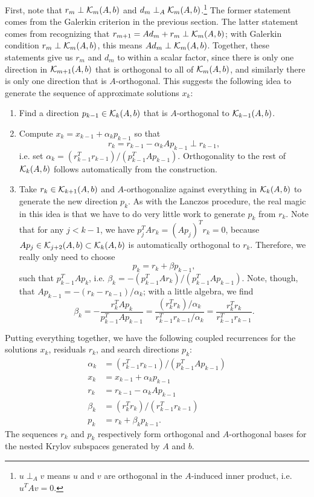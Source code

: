 First, note that $r_m \perp \mathcal{K}_{m}(A,b)$ and $d_m \perp_A
\mathcal{K}_{m}(A,b)$.\footnote{
  $u \perp_A v$ means $u$ and $v$ are orthogonal
  in the $A$-induced inner product, i.e. $u^T A v = 0$.
}  The former statement comes from the Galerkin
criterion in the previous section.  The latter statement comes from
recognizing that $r_{m+1} = Ad_m + r_m \perp \mathcal{K}_{m}(A,b)$; with
Galerkin condition $r_m \perp \mathcal{K}_{m}(A,b)$, this means $Ad_m \perp
\mathcal{K}_{m}(A,b)$.  Together, these statements give us $r_m$ and $d_m$
to within a scalar factor, since there is only one direction in
$\mathcal{K}_{m+1}(A,b)$ that is orthogonal to all of $\mathcal{K}_{m}(A,b)$, and
similarly there is only one direction that is $A$-orthogonal.
This suggests the following idea to generate the sequence of
approximate solutions $x_k$:
\begin{enumerate}
\item
  Find a direction $p_{k-1} \in \mathcal{K}_{k}(A,b)$ that is $A$-orthogonal
  to $\mathcal{K}_{k-1}(A,b)$.
\item
  Compute $x_{k} = x_{k-1} + \alpha_k p_{k-1}$ so that
  \[
    r_k = r_{k-1} - \alpha_k A p_{k-1} \perp r_{k-1},
  \]
  i.e. set $\alpha_k = (r_{k-1}^T r_{k-1}) / (p_{k-1}^T A p_{k-1})$.
  Orthogonality to the rest of $\mathcal{K}_{k}(A,b)$ follows
  automatically from the construction.
\item
  Take $r_k \in \mathcal{K}_{k+1}(A,b)$ and $A$-orthogonalize against
  everything in $\mathcal{K}_{k}(A,b)$ to generate the new direction $p_k$.
  As with the Lanczos procedure, the real magic in this idea is that
  we have to do very little work to generate $p_k$ from $r_k$.
  Note that for any $j < k-1$, we have $p_j^T A r_k = (Ap_j)^T r_k = 0$,
  because $Ap_j \in \mathcal{K}_{j+2}(A,b) \subset \mathcal{K}_k(A,b)$ is automatically
  orthogonal to $r_k$.  Therefore, we really only need to choose
  \[
    p_k = r_k + \beta p_{k-1},
  \]
  such that $p_{k-1}^T A p_k$, i.e.
  $\beta_k = -(p_{k-1}^T A r_k)/(p_{k-1}^T A p_{k-1})$.
  Note, though, that $Ap_{k-1} = -(r_{k}-r_{k-1})/\alpha_k$;
  with a little algebra, we find
  \[
    \beta_k = -\frac{r_k^T Ap_k}{p_{k-1}^T A p_{k-1}}
            = \frac{(r_k^T r_k)/\alpha_k}{r_{k-1}^T r_{k-1}/\alpha_k}
            = \frac{r_k^T r_k}{r_{k-1}^T r_{k-1}}.
  \]
\end{enumerate}

Putting everything together, we have the following coupled recurrences
for the solutions $x_k$, residuals $r_k$, and search directions $p_k$:
\begin{align*}
  \alpha_k &= (r_{k-1}^T r_{k-1})/(p_{k-1}^T A p_{k-1}) \\
  x_{k} &= x_{k-1} + \alpha_k p_{k-1} \\
  r_{k} &= r_{k-1} - \alpha_k A p_{k-1} \\
  \beta_{k} &= (r_k^T r_k)/(r_{k-1}^T r_{k-1}) \\
  p_k &= r_{k} + \beta_k p_{k-1}.
\end{align*}
The sequences $r_k$ and $p_k$ respectively form orthogonal and $A$-orthogonal
bases for the nested Krylov subspaces generated by $A$ and $b$.

